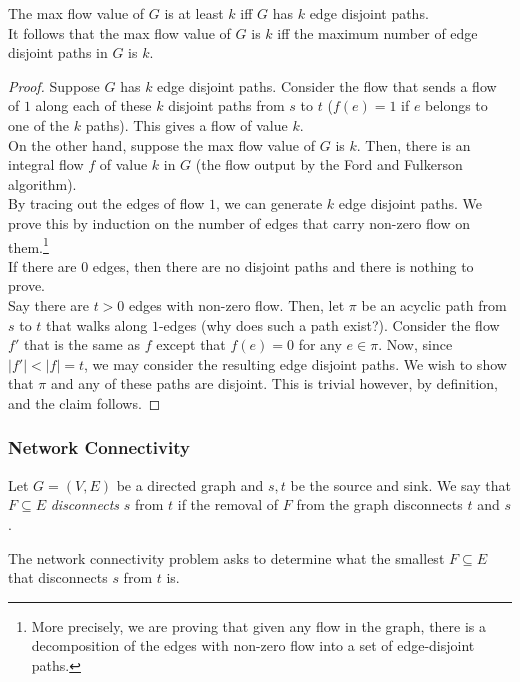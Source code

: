 		\begin{lemma}
			\label{edge disjoint paths}
			The max flow value of $G$ is at least $k$ iff $G$ has $k$ edge disjoint paths.\\
			It follows that the max flow value of $G$ is $k$ iff the maximum number of edge disjoint paths in $G$ is $k$.
		\end{lemma}
		\begin{proof}
			Suppose $G$ has $k$ edge disjoint paths. Consider the flow that sends a flow of $1$ along each of these $k$ disjoint paths from $s$ to $t$ ($f(e)=1$ if $e$ belongs to one of the $k$ paths). This gives a flow of value $k$.\\

			On the other hand, suppose the max flow value of $G$ is $k$. Then, there is an integral flow $f$ of value $k$ in $G$ (the flow output by the Ford and Fulkerson algorithm).\\
			By tracing out the edges of flow $1$, we can generate $k$ edge disjoint paths. We prove this by induction on the number of edges that carry non-zero flow on them.\footnote{More precisely, we are proving that given any flow in the graph, there is a decomposition of the edges with non-zero flow into a set of edge-disjoint paths.}\\
			If there are $0$ edges, then there are no disjoint paths and there is nothing to prove.\\
			Say there are $t>0$ edges with non-zero flow. Then, let $\pi$ be an acyclic path from $s$ to $t$ that walks along $1$-edges (why does such a path exist?). Consider the flow $f'$ that is the same as $f$ except that $f(e)=0$ for any $e\in\pi$. Now, since $|f'|<|f|=t$, we may consider the resulting edge disjoint paths. We wish to show that $\pi$ and any of these paths are disjoint. This is trivial however, by definition, and the claim follows.
		\end{proof}

	\subsubsection{Network Connectivity}

		Let $G=(V,E)$ be a directed graph and $s,t$ be the source and sink. We say that $F\subseteq E$ \textit{disconnects} $s$ from $t$ if the removal of $F$ from the graph disconnects $t$ and $s$.

		The network connectivity problem asks to determine what the smallest $F\subseteq E$ that disconnects $s$ from $t$ is.

